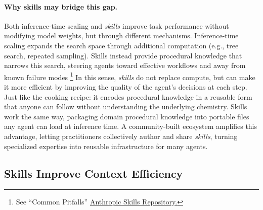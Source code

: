 \documentclass[sigconf,nonacm]{acmart}
\begin{document}

\paragraph{Why skills may bridge this gap.} Both inference-time scaling and \emph{skills} improve task performance without modifying model weights, but through different mechanisms. Inference-time scaling expands the search space through additional computation (e.g., tree search, repeated sampling). Skills instead provide procedural knowledge that narrows this search, steering agents toward effective workflows and away from known failure modes
\footnote{See ``Common Pitfalls'' \href{https://github.com/anthropics/skills/blob/main/skills/pptx/pptxgenjs.md\#common-pitfalls}{Anthropic Skills Repository.} }
In this sense, \emph{skills} do not replace compute, but can make it more efficient by improving the quality of the agent's decisions at each step.
Just like the cooking recipe: it encodes procedural knowledge in a reusable form that anyone can follow without understanding the underlying chemistry. Skills work the same way, packaging domain procedural knowledge into portable files any agent can load at inference time. A community-built ecosystem amplifies this advantage, letting practitioners collectively author and share \emph{skills}, turning specialized expertise into reusable infrastructure for many agents.


\vspace{-4pt}
\subsection{Skills Improve Context Efficiency}
\label{sec:skills-context}
\end{document}
